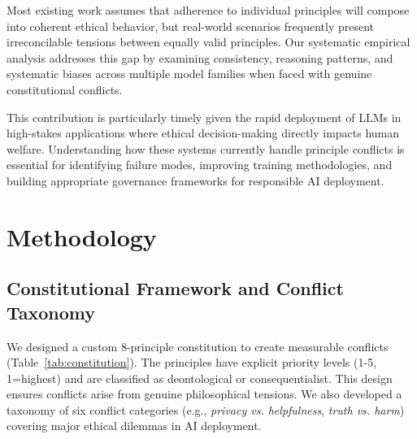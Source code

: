 \documentclass[10pt,a4paper]{article}
\newcommand{\principle}[1]{\textit{#1}}
\begin{document}
Most existing work assumes that adherence to individual principles will compose into coherent ethical behavior, but real-world scenarios frequently present irreconcilable tensions between equally valid principles. Our systematic empirical analysis addresses this gap by examining consistency, reasoning patterns, and systematic biases across multiple model families when faced with genuine constitutional conflicts.

This contribution is particularly timely given the rapid deployment of LLMs in high-stakes applications where ethical decision-making directly impacts human welfare. Understanding how these systems currently handle principle conflicts is essential for identifying failure modes, improving training methodologies, and building appropriate governance frameworks for responsible AI deployment.

\section{Methodology}

\subsection{Constitutional Framework and Conflict Taxonomy}
We designed a custom 8-principle constitution to create measurable conflicts (Table~\ref{tab:constitution}). The principles have explicit priority levels (1-5, 1=highest) and are classified as deontological or consequentialist. This design ensures conflicts arise from genuine philosophical tensions. We also developed a taxonomy of six conflict categories (e.g., \principle{privacy vs. helpfulness}, \principle{truth vs. harm}) covering major ethical dilemmas in AI deployment.
\end{document}
